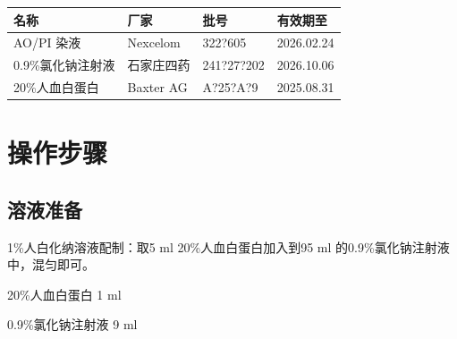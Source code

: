 \documentclass[UTF8,10pt,a4paper,fontset=fandol]{ctexart}
\newcommand{\fieldvalue}[1]{#1}
\newcommand{\handwritten}[1]{#1}
\begin{document}
\begin{center}
\begin{tabular}{|p{3.5cm}|p{3.5cm}|p{4.5cm}|p{3.2cm}|}
\hline
名称 & 厂家 & 批号 & 有效期至 \\
\hline
\fieldvalue{AO/PI 染液} &
\fieldvalue{Nexcelom} &
\fieldvalue{\handwritten{322?605}} &
\fieldvalue{\handwritten{2026.02.24}} \\
\hline
\fieldvalue{0.9\%氯化钠注射液} &
\fieldvalue{石家庄四药} &
\fieldvalue{\handwritten{241?27?202}} &
\fieldvalue{\handwritten{2026.10.06}} \\
\hline
\fieldvalue{20\%人血白蛋白} &
\fieldvalue{Baxter AG} &
\fieldvalue{\handwritten{A?25?A?9}} &
\fieldvalue{\handwritten{2025.08.31}} \\
\hline
\end{tabular}
\end{center}

\section{操作步骤}

\subsection*{溶液准备}

1\%人白化纳溶液配制：取5 ml 20\%人血白蛋白加入到95 ml 的0.9\%氯化钠注射液中，混匀即可。

20\%人血白蛋白
\fieldvalue{\handwritten{1}} ml

0.9\%氯化钠注射液
\fieldvalue{\handwritten{9}} ml
\end{document}
